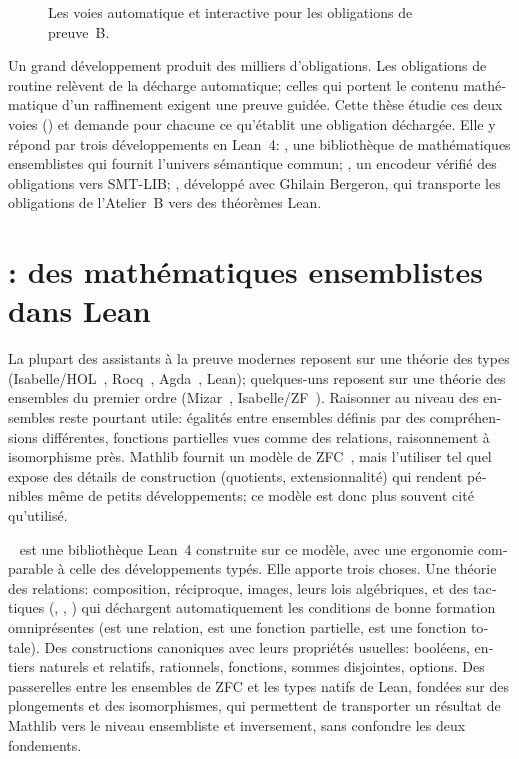 \begin{otherlanguage}{french}
\begin{figure}[t]
  \caption{Les voies automatique et interactive pour les obligations de
    preuve~B.}
  \label{fig:resume-routes}
\end{figure}

Un grand développement produit des milliers d'obligations. Les obligations de
routine relèvent de la décharge automatique; celles qui portent le contenu
mathématique d'un raffinement exigent une preuve guidée. Cette thèse étudie
ces deux voies () et demande pour chacune ce
qu'établit une obligation déchargée. Elle y répond par trois développements
en Lean~4: \zflean{}, une bibliothèque de mathématiques ensemblistes qui
fournit l'univers sémantique commun; \beer{}, un encodeur vérifié des
obligations vers SMT-LIB; \barrel{}, développé avec Ghilain Bergeron, qui
transporte les obligations de l'Atelier~B vers des théorèmes Lean.

\section*{\zflean{}: des mathématiques ensemblistes dans Lean}

La plupart des assistants à la preuve modernes reposent sur une théorie des
types (Isabelle/HOL~\cite{NipkowPaulsonWenzel2002},
Rocq~\cite{RocqReferenceManual}, Agda~\cite{AgdaReferenceManual}, Lean);
quelques-uns reposent sur une théorie des ensembles du premier ordre
(Mizar~\cite{mizar-sota}, Isabelle/ZF~\cite{paulson-zf}). Raisonner au
niveau des ensembles reste pourtant utile: égalités entre ensembles définis par des
compréhensions différentes, fonctions partielles vues comme des relations,
raisonnement \og à isomorphisme près\fg. Mathlib fournit un modèle de
ZFC~\cite{mathlib-zfc}, mais l'utiliser tel quel expose des détails de construction (quotients,
extensionnalité) qui rendent pénibles même de petits développements; ce
modèle est donc plus souvent cité qu'utilisé.

\zflean{}~\cite{trelat2026zflean} est une bibliothèque Lean~4 construite sur
ce modèle, avec une ergonomie comparable à celle des développements typés.
Elle apporte trois choses. Une théorie des relations: composition,
réciproque, images, leurs lois algébriques, et des tactiques (,
, ) qui déchargent automatiquement les
conditions de bonne formation omniprésentes (\og est une relation\fg, \og est
une fonction partielle\fg, \og est une fonction totale\fg). Des constructions
canoniques avec leurs propriétés usuelles: booléens, entiers naturels et
relatifs, rationnels, fonctions, sommes disjointes, options. Des passerelles
entre les ensembles de ZFC et les types natifs de Lean, fondées sur des
plongements et des isomorphismes, qui permettent de transporter un résultat
de Mathlib vers le niveau ensembliste et inversement, sans confondre les deux
fondements.


\end{otherlanguage}
